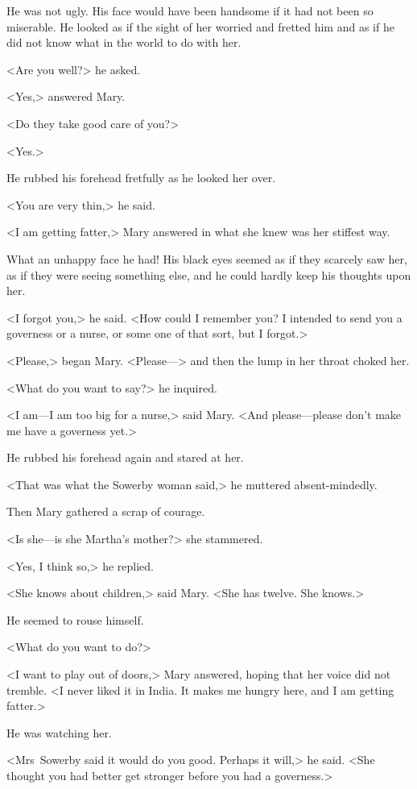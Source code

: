 He was not ugly. His face would have been handsome if it had not been so miserable. He looked as if the sight of her worried and fretted him and as if he did not know what in the world to do with her.

<Are you well?> he asked.

<Yes,> answered Mary.

<Do they take good care of you?>

<Yes.>

He rubbed his forehead fretfully as he looked her over.

<You are very thin,> he said.

<I am getting fatter,> Mary answered in what she knew was her stiffest way.

What an unhappy face he had! His black eyes seemed as if they scarcely saw her, as if they were seeing something else, and he could hardly keep his thoughts upon her.

<I forgot you,> he said. <How could I remember you? I intended to send you a governess or a nurse, or some one of that sort, but I forgot.>

<Please,> began Mary. <Please—> and then the lump in her throat choked her.

<What do you want to say?> he inquired.

<I am—I am too big for a nurse,> said Mary. <And please—please don't make me have a governess yet.>

He rubbed his forehead again and stared at her.

<That was what the Sowerby woman said,> he muttered absent-mindedly.

Then Mary gathered a scrap of courage.

<Is she—is she Martha's mother?> she stammered.

<Yes, I think so,> he replied.

<She knows about children,> said Mary. <She has twelve. She knows.>

He seemed to rouse himself.

<What do you want to do?>

<I want to play out of doors,> Mary answered, hoping that her voice did not tremble. <I never liked it in India. It makes me hungry here, and I am getting fatter.>

He was watching her.

<Mrs~Sowerby said it would do you good. Perhaps it will,> he said. <She thought you had better get stronger before you had a governess.>

